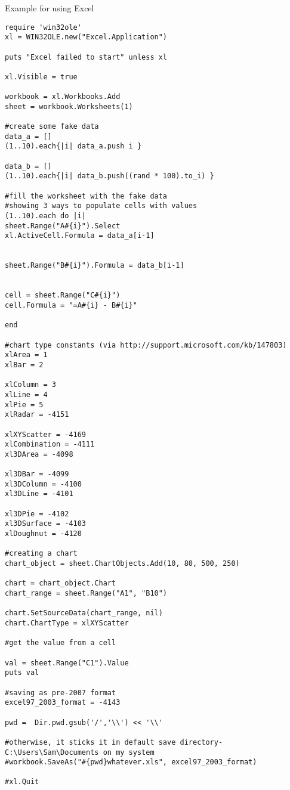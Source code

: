\vpara
Example for using Excel

\begin{lstlisting}
require 'win32ole'
xl = WIN32OLE.new("Excel.Application")

puts "Excel failed to start" unless xl

xl.Visible = true

workbook = xl.Workbooks.Add
sheet = workbook.Worksheets(1)

#create some fake data
data_a = []
(1..10).each{|i| data_a.push i }

data_b = []
(1..10).each{|i| data_b.push((rand * 100).to_i) }

#fill the worksheet with the fake data
#showing 3 ways to populate cells with values
(1..10).each do |i|
sheet.Range("A#{i}").Select
xl.ActiveCell.Formula = data_a[i-1]


sheet.Range("B#{i}").Formula = data_b[i-1]


cell = sheet.Range("C#{i}")
cell.Formula = "=A#{i} - B#{i}"

end 

#chart type constants (via http://support.microsoft.com/kb/147803)
xlArea = 1
xlBar = 2

xlColumn = 3
xlLine = 4
xlPie = 5
xlRadar = -4151

xlXYScatter = -4169
xlCombination = -4111
xl3DArea = -4098

xl3DBar = -4099
xl3DColumn = -4100
xl3DLine = -4101 

xl3DPie = -4102
xl3DSurface = -4103
xlDoughnut = -4120

#creating a chart 
chart_object = sheet.ChartObjects.Add(10, 80, 500, 250)

chart = chart_object.Chart
chart_range = sheet.Range("A1", "B10")

chart.SetSourceData(chart_range, nil)
chart.ChartType = xlXYScatter

#get the value from a cell

val = sheet.Range("C1").Value
puts val

#saving as pre-2007 format
excel97_2003_format = -4143 

pwd =  Dir.pwd.gsub('/','\\') << '\\'

#otherwise, it sticks it in default save directory- C:\Users\Sam\Documents on my system
#workbook.SaveAs("#{pwd}whatever.xls", excel97_2003_format)

#xl.Quit
\end{lstlisting}




